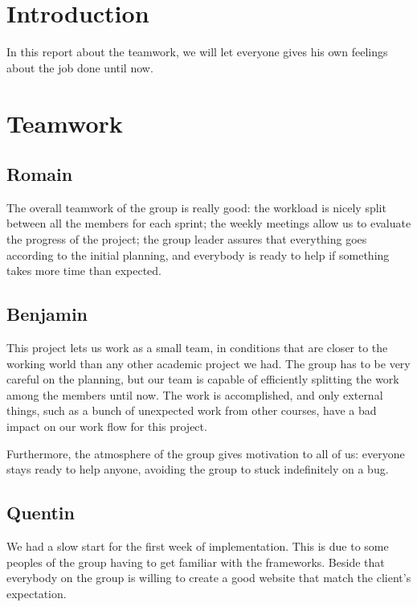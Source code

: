 \section{Introduction}

In this report about the teamwork, we will let everyone gives his own
feelings about the job done until now.

\section{Teamwork}

\subsection{Romain}
The overall teamwork of the group is really good: the workload is nicely
split between all the members for each sprint; the weekly meetings allow
us to evaluate the progress of the project; the group leader assures that
everything goes according to the initial planning, and everybody is ready to
help if something takes more time than expected. \newline

\subsection{Benjamin}

This project lets us work as a small team, in conditions that are closer to
the working world than any other academic project we had. The group has to
be very careful on the planning, but our team is capable of efficiently
splitting the work among the members until now. The work is accomplished,
and only external things, such as a bunch of unexpected work from other
courses, have a bad impact on our work flow for this project. \newline

Furthermore, the atmosphere of the group gives motivation to all of us:
everyone stays ready to help anyone, avoiding the group to stuck
indefinitely on a bug.

\subsection{Quentin}
We had a slow start for the first week of implementation. This is due to
some peoples of the group having to get familiar with the frameworks.
Beside that everybody on the group is willing to create a good website that
match the client's expectation. \newline

